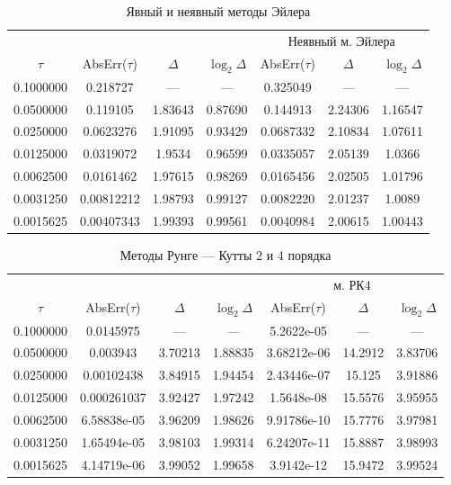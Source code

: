 \documentclass[12pt, a4paper]{article}
\begin{document}
	\begin{table}[H]
		\caption{Явный и неявный методы Эйлера}
		\centering
		\begin{tabular}{|c|c|c|c||c|c|c|}\hline
			& \multicolumn{3}{c||}{\makecell{Явный м. Эйлера}} & \multicolumn{3}{c|}{Неявный м. Эйлера} \\\cline{2-7}
			$\tau$ & AbsErr($\tau$) & $\Delta$ & $\log_2 \Delta$ & AbsErr($\tau$) & $\Delta$ & $\log_2 \Delta$ \\ \hline
			0.1000000 & 0.218727   &   ---   & ---     & 0.325049&     --- &   ---   \\ \hline
			0.0500000 & 0.119105   & 1.83643 & 0.87690 & 0.144913& 2.24306 & 1.16547 \\ \hline
			0.0250000 & 0.0623276  & 1.91095 & 0.93429 &0.0687332& 2.10834 & 1.07611 \\ \hline
			0.0125000 & 0.0319072  & 1.9534  & 0.96599 &0.0335057& 2.05139 & 1.0366  \\ \hline
			0.0062500 & 0.0161462  & 1.97615 & 0.98269 &0.0165456& 2.02505 & 1.01796 \\ \hline
			0.0031250 & 0.00812212 & 1.98793 & 0.99127 &0.0082220& 2.01237 & 1.0089  \\ \hline
			0.0015625 & 0.00407343 & 1.99393 & 0.99561 &0.0040984& 2.00615 & 1.00443 \\ \hline
		\end{tabular}
	\end{table}
	
	\begin{table}[H]
		\caption{Методы Рунге --- Кутты 2 и 4 порядка}
		\centering
		\begin{tabular}{|c|c|c|c||c|c|c|}\hline
			& \multicolumn{3}{c||}{\makecell{м. РК2}} & \multicolumn{3}{c|}{м. РК4} \\\cline{2-7}
			$\tau$ & AbsErr($\tau$) & $\Delta$ & $\log_2 \Delta$ & AbsErr($\tau$) & $\Delta$ & $\log_2 \Delta$ \\ \hline
			0.1000000 & 0.0145975  &   ---   & ---     & 5.2622e-05&     --- &   ---   \\ \hline
			0.0500000 & 0.003943   & 3.70213 & 1.88835 & 3.68212e-06 & 14.2912 & 3.83706 \\ \hline
			0.0250000 & 0.00102438 & 3.84915 & 1.94454 & 2.43446e-07 & 15.125  & 3.91886 \\ \hline
			0.0125000 &0.000261037 & 3.92427 & 1.97242 & 1.5648e-08  & 15.5576 & 3.95955  \\ \hline
			0.0062500 &6.58838e-05 & 3.96209 & 1.98626 & 9.91786e-10 & 15.7776 & 3.97981 \\ \hline
			0.0031250 &1.65494e-05 & 3.98103 & 1.99314 & 6.24207e-11 & 15.8887 & 3.98993  \\ \hline
			0.0015625 &4.14719e-06 & 3.99052 & 1.99658 & 3.9142e-12  & 15.9472 & 3.99524 \\ \hline
		\end{tabular}
	\end{table}
	
\end{document}
